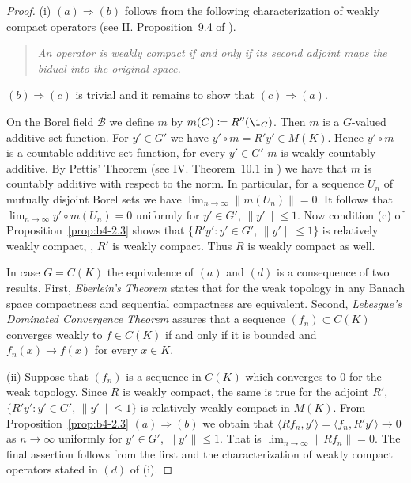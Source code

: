 \begin{proof}
	(i) $(a)\Rightarrow(b)$ follows from the following characterization of
	weakly compact operators (see \eg II. Proposition~9.4 of \citet{schaefer:1974}).
	\begin{quote}
		\emph{
			An operator is weakly compact if and only if its second adjoint
		maps the bidual into the original space.
		}
	\end{quote}
	$(b)\Rightarrow(c)$ is trivial and it remains to show that $(c) \Rightarrow (a)$.
	
	On the Borel field $\mathcal{B}$ we define $m$ by $m(C)  \coloneq  R''(\1_C)$.
	Then $m$ is
	a $G$-valued additive set function.
	For $y' \in G'$ we have
	$y'\circ m = R'y' \in M(K)$.
	Hence $y'\circ m$ is a countable additive set function, for every $y' \in G'$  \ie $m$ is weakly countably additive.
	By Pettis' Theorem (see IV. Theorem~10.1 in 
	\citet{dunfordschwartz:1958}) we have
	that $m$ is countably additive with respect to the norm.
	In particular, for a sequence $U_n$ of mutually disjoint Borel sets we have
	$\lim_{n\to\infty}\|m(U_n)\| = 0$.
	It follows that $\lim_{n\to\infty}y'\circ m(U_n) = 0$ uniformly for
	$y' \in G'$, $\|y'\| \leq 1$.
	Now condition (c) of Proposition~\ref{prop:b4-2.3} shows that $\{R'y'
	\colon y' \in G'$, $\|y'\| \leq 1\}$ is relatively weakly compact, \ie, $R'$ is
	weakly compact.
	Thus $R$ is weakly compact as well.
	
	In case $G = C(K)$ the equivalence of $(a)$ and $(d)$ is a consequence of
	two results. First, \emph{Eberlein's Theorem} states that for the weak topology in any Banach space compactness and sequential compactness are
	equivalent.
	Second, \emph{Lebesgue's Dominated Convergence Theorem} assures
	that a sequence $(f_n) \subset C(K)$ converges weakly to $f \in C(K)$ if and
	only if it is bounded and $f_n(x) \to f(x)$ for every $x \in K$.
	
	(ii) Suppose that $(f_n)$ is a sequence in $C(K)$ which converges to $0$ for
	the weak topology.
	Since $R$ is weakly compact, the same is true for
	the adjoint $R'$, \ie $\{R'y' \colon y' \in G'$, $\|y'\| \leq 1\}$ is relatively weakly compact in $M(K)$.
	From Proposition~\ref{prop:b4-2.3} $(a)\Rightarrow(b)$ we obtain that
	$\langle Rf_n,y'\rangle = \langle f_n,R'y'\rangle \to 0$ as $n \to \infty$ uniformly for $y' \in G'$, $\|y'\|\leq1$.
	That is $\lim_{n\to\infty}\|Rf_n\| = 0$.
	The final assertion follows from the first and the characterization of
	weakly compact operators stated in $(d)$ of (i).
\end{proof}

